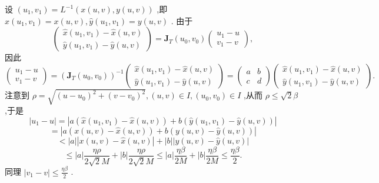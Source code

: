 设 \(\left( {{u}_{1},{v}_{1}}\right)  = {L}^{-1}\left( {x\left( {u,v}\right) ,y\left( {u,v}\right) }\right)\) ,即 \(\widehat{x}\left( {{u}_{1},{v}_{1}}\right)  = x\left( {u,v}\right) ,\widehat{y}\left( {{u}_{1},{v}_{1}}\right)  = y\left( {u,v}\right)\) . 由于
\[
\left( \begin{array}{l} \widehat{x}\left( {{u}_{1},{v}_{1}}\right)  - \widehat{x}\left( {u,v}\right) \\  \widehat{y}\left( {{u}_{1},{v}_{1}}\right)  - \widehat{y}\left( {u,v}\right)  \end{array}\right)  = {\mathbf{J}}_{T}\left( {{u}_{0},{v}_{0}}\right) \left( \begin{array}{l} {u}_{1} - u \\  {v}_{1} - v \end{array}\right) ,
\]
因此
\[
\left( \begin{array}{l} {u}_{1} - u \\  {v}_{1} - v \end{array}\right)  = {\left( {\mathbf{J}}_{T}\left( {u}_{0},{v}_{0}\right) \right) }^{-1}\left( \begin{array}{l} \widehat{x}\left( {{u}_{1},{v}_{1}}\right)  - \widehat{x}\left( {u,v}\right) \\  \widehat{y}\left( {{u}_{1},{v}_{1}}\right)  - \widehat{y}\left( {u,v}\right)  \end{array}\right)  = \left( \begin{array}{ll} a & b \\  c & d \end{array}\right) \left( \begin{array}{l} \widehat{x}\left( {{u}_{1},{v}_{1}}\right)  - \widehat{x}\left( {u,v}\right) \\  \widehat{y}\left( {{u}_{1},{v}_{1}}\right)  - \widehat{y}\left( {u,v}\right)  \end{array}\right) .
\]
注意到 \(\rho  = \sqrt{{\left( u - {u}_{0}\right) }^{2} + {\left( v - {v}_{0}\right) }^{2}},\left( {u,v}\right)  \in  I,\left( {{u}_{0},{v}_{0}}\right)  \in  I\) ,从而 \(\rho  \leq  \sqrt{2}\beta\) ,于是
\[
\left| {{u}_{1} - u}\right|  = \left| {a\left( {\widehat{x}\left( {{u}_{1},{v}_{1}}\right)  - \widehat{x}\left( {u,v}\right) }\right)  + b\left( {\widehat{y}\left( {{u}_{1},{v}_{1}}\right)  - \widehat{y}\left( {u,v}\right) }\right) }\right|
\]
\[
= \left| {a\left( {x\left( {u,v}\right)  - \widehat{x}\left( {u,v}\right) }\right)  + b\left( {y\left( {u,v}\right)  - \widehat{y}\left( {u,v}\right) }\right) }\right|
\]
\[
< \left| a\right| \left| {x\left( {u,v}\right)  - \widehat{x}\left( {u,v}\right) }\right|  + \left| b\right| \left| {y\left( {u,v}\right)  - \widehat{y}\left( {u,v}\right) }\right|
\]
\[
\leq  \left| a\right| \frac{\eta \rho }{2\sqrt{2}M} + \left| b\right| \frac{\eta \rho }{2\sqrt{2}M} \leq  \left| a\right| \frac{\eta \beta }{2M} + \left| b\right| \frac{\eta \beta }{2M} \leq  \frac{\eta \beta }{2}.
\]
同理 \(\left| {{v}_{1} - v}\right|  \leq  \frac{\eta \beta }{2}\) .

